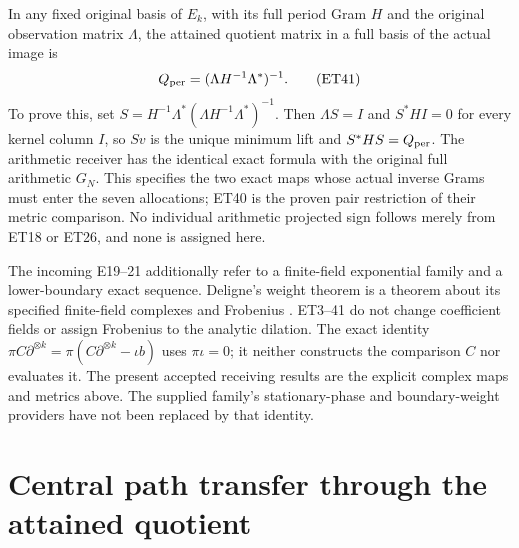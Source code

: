 In any fixed original basis of \(E_k\), with its full period Gram
\(H\) and the original observation matrix \(\Lambda\), the attained
quotient matrix in a full basis of the actual image is
\[
 Q_{\rm per}=(\Lambda H^{-1}\Lambda^*)^{-1}.           \tag{ET41}
\]
To prove this, set
\(S=H^{-1}\Lambda^*(\Lambda H^{-1}\Lambda^*)^{-1}\).
Then \(\Lambda S=I\) and \(S^*HI=0\) for every kernel column \(I\),
so \(Sv\) is the unique minimum lift and \(S^*HS=Q_{\rm per}\).
The arithmetic receiver has the identical exact formula with the
original full arithmetic \(G_N\). This specifies the two exact
maps whose actual inverse Grams must enter the seven allocations;
ET40 is the proven pair restriction of their metric comparison.
No individual arithmetic projected sign follows merely from ET18
or ET26, and none is assigned here.

The incoming E19--21 additionally refer to a finite-field exponential
family and a lower-boundary exact sequence. Deligne's weight theorem
is a theorem about its specified finite-field complexes and Frobenius
\cite[Thm.\ 3.3.1]{et:Deligne}. ET3--41 do not change coefficient fields
or assign Frobenius to the analytic dilation. The exact identity
\(\pi C\partial^{\otimes k}=\pi(C\partial^{\otimes k}-\iota b)\)
uses \(\pi\iota=0\); it neither constructs the comparison \(C\) nor
evaluates it. The present accepted receiving results are the explicit
complex maps and metrics above. The supplied family's stationary-phase
and boundary-weight providers have not been replaced by that identity.



\endgroup

\clearpage
\begingroup
\def\C{\mathbb C}
\def\R{\mathbb R}
\def\PP{\mathcal P}
\def\Bcal{\mathcal B}
\def\Rcal{\mathcal R}
\def\Scal{\mathcal S}
\def\norm#1{\left\lVert#1\right\rVert}
\def\ip#1#2{\left\langle#1,#2\right\rangle}
\def\Tr{\operatorname{Tr}}
\def\diag{\operatorname{diag}}
\def\im{\operatorname{im}}
\def\rem{\operatorname{rem}}
\def\rad{\operatorname{rad}}

\setcounter{equation}{0}
\renewcommand{\theequation}{CPT.\arabic{equation}}
\section*{Central path transfer through the attained quotient}



